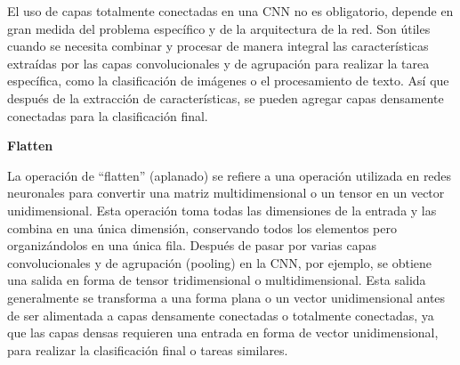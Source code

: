 El uso de capas totalmente conectadas en una CNN no es obligatorio, depende en gran medida del problema específico y de la arquitectura de la red. Son útiles cuando se necesita combinar y procesar de manera integral las características extraídas por las capas convolucionales y de agrupación para realizar la tarea específica, como la clasificación de imágenes o el procesamiento de texto. Así que después de la extracción de características, se pueden agregar capas densamente conectadas para la clasificación final.

\textbf{Flatten}

La operación de ``flatten'' (aplanado) se refiere a una operación utilizada en redes neuronales para convertir una matriz multidimensional o un tensor en un vector unidimensional. Esta operación toma todas las dimensiones de la entrada y las combina en una única dimensión, conservando todos los elementos pero organizándolos en una única fila.
Después de pasar por varias capas convolucionales y de agrupación (pooling) en la CNN, por ejemplo, se obtiene una salida en forma de tensor tridimensional o multidimensional. Esta salida generalmente se transforma a una forma plana o un vector unidimensional antes de ser alimentada a capas densamente conectadas o totalmente conectadas, ya que las capas densas requieren una entrada en forma de vector unidimensional, para realizar la clasificación final o tareas similares.


